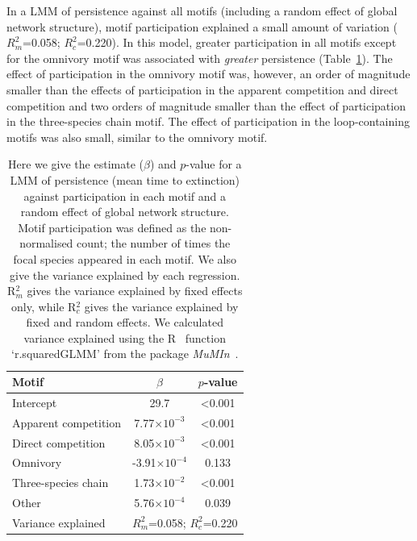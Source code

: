 \documentclass[12pt]{article}
\begin{document}
\begin{spacing}{2.0}
		In a LMM of persistence against all motifs (including a random effect of global network structure), motif participation explained a small amount of variation ($R^{2}_m$=0.058; $R^2_c$=0.220).
		In this model, greater participation in all motifs except for the omnivory motif was associated with \emph{greater} persistence (Table~\ref{tab:persistence_motifs}).
		The effect of participation in the omnivory motif was, however, an order of magnitude smaller than the effects of participation in the apparent competition and direct competition and two orders of magnitude smaller than the effect of participation in the three-species chain motif.
		The effect of participation in the loop-containing motifs was also small, similar to the omnivory motif.


		\begin{table}[h!]
    		\caption{Here we give the estimate ($\beta$) and $p$-value for a LMM of persistence (mean time to extinction) against participation in each motif and a random effect of global network structure. Motif participation was defined as the non-normalised count; the number of times the focal species appeared in each motif. We also give the variance explained by each regression. R$^{2}_{m}$ gives the variance explained by fixed effects only, while R$^{2}_{c}$ gives the variance explained by fixed and random effects. We calculated variance explained using the R~\citep{R} function `r.squaredGLMM' from the package \emph{MuMIn}~\citep{MuMIn}.}
    		\label{tab:persistence_motifs}
    		\begin{tabular}{l | c c}
    		 Motif & $\beta$ & $p$-value \\  
    		 \hline
    		 Intercept & 29.7 & \textless0.001 \\
    		 \hline
    		 Apparent competition & 7.77$\times10^{-3}$ & \textless0.001 \\
    		 Direct competition & 8.05$\times10^{-3}$ & \textless0.001 \\
    		 Omnivory &  -3.91$\times10^{-4}$ & 0.133 \\
    		 Three-species chain &  1.73$\times10^{-2}$ & \textless0.001 \\
    		 Other &  5.76$\times10^{-4}$ & 0.039 \\
    		 \hline
    		 Variance explained & \multicolumn{2}{c}{$R^{2}_m$=0.058; $R^2_c$=0.220} \\
    		 \hline
    		 \end{tabular}
    		 \end{table}
    


\end{spacing}
\end{document}
